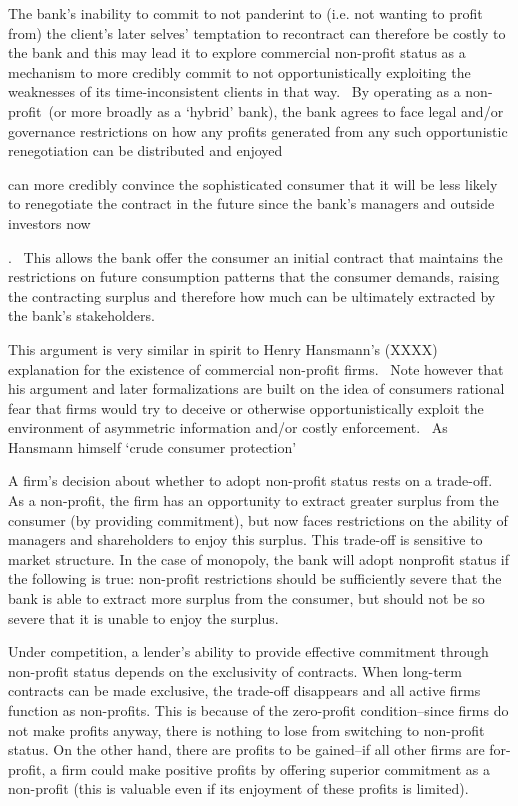 \documentclass[11pt]{article}%
\begin{document}
The bank's inability to commit to not panderint to (i.e. not wanting to profit
from) the client's later selves' temptation to recontract can therefore be
costly to the bank and this may lead it to explore commercial non-profit
status as a mechanism to more credibly commit to not opportunistically
exploiting the weaknesses of its time-inconsistent clients in that way. \ By
operating as a non-profit\ (or more broadly as a `hybrid' bank), the bank
agrees to face legal and/or governance restrictions on how any profits
generated from any such opportunistic renegotiation can be distributed and enjoyed

can more credibly convince the sophisticated consumer that it will be less
likely to renegotiate the contract in the future since the bank's managers and
outside investors now

. \ This allows the bank offer the consumer an initial contract that maintains
the restrictions on future consumption patterns that the consumer demands,
raising the contracting surplus and therefore how much can be ultimately
extracted by the bank's stakeholders. \ 

This argument is very similar in spirit to Henry Hansmann's (XXXX) explanation
for the existence of commercial non-profit firms. \ Note however that his
argument and later formalizations are built on the idea of consumers rational
fear that firms would try to deceive or otherwise opportunistically exploit
the environment of asymmetric information and/or costly enforcement. \ As
Hansmann himself `crude consumer protection'

A firm's decision about whether to adopt non-profit status rests on a
trade-off. As a non-profit, the firm has an opportunity to extract greater
surplus from the consumer (by providing commitment), but now faces
restrictions on the ability of managers and shareholders to enjoy this
surplus. This trade-off is sensitive to market structure. In the case of
monopoly, the bank will adopt nonprofit status if the following is true:
non-profit restrictions should be sufficiently severe that the bank is able to
extract more surplus from the consumer, but should not be so severe that it is
unable to enjoy the surplus.

Under competition, a lender's ability to provide effective commitment through
non-profit status depends on the exclusivity of contracts. When long-term
contracts can be made exclusive, the trade-off disappears and all active firms
function as non-profits. This is because of the zero-profit condition--since
firms do not make profits anyway, there is nothing to lose from switching to
non-profit status. On the other hand, there are profits to be gained--if all
other firms are for-profit, a firm could make positive profits by offering
superior commitment as a non-profit (this is valuable even if its enjoyment of
these profits is limited).
\end{document}
